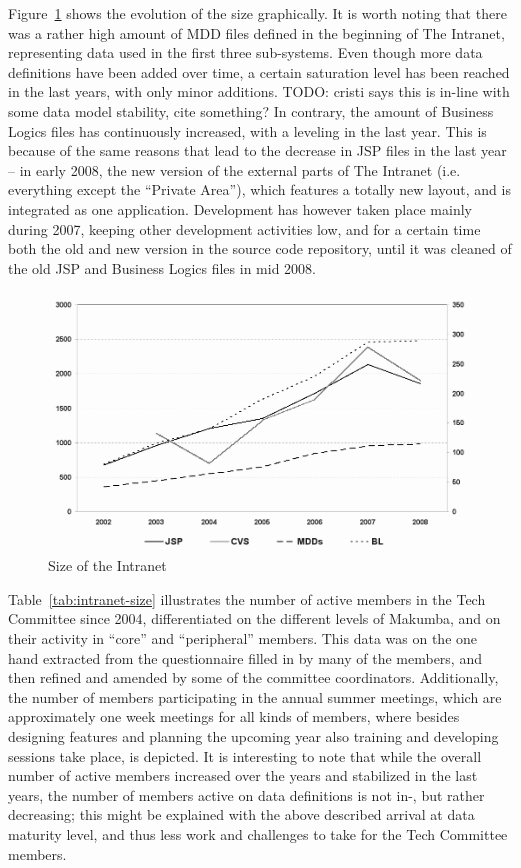 \documentclass{acm_proc_article-sp}
\begin{document}
Figure~\ref{fig:intranet-size} shows the evolution of the size graphically. It is worth noting that there was a rather high amount of MDD files defined in the beginning of The Intranet, representing data used in the first three sub-systems. Even though more data definitions have been added over time, a certain saturation level has been reached in the last years, with only minor additions. TODO: cristi says this is in-line with some data model stability, cite something?
In contrary, the amount of Business Logics files has continuously increased, with a leveling in the last year. This is because of the same reasons that lead to the decrease in JSP files in the last year -- in early 2008, the new version of the external parts of The Intranet (i.e. everything except the ``Private Area''), which features a totally new layout, and is integrated as one application. Development has however taken place mainly during 2007, keeping other development activities low, and for a certain time both the old and new version in the source code repository, until it was cleaned of the old JSP and Business Logics files in mid 2008.

\begin{figure}\label{fig:intranet-size}
  \includegraphics[width=0.98\columnwidth]{figures/SizeChart}
  \caption{Size of the Intranet}
\end{figure} 

Table~\ref{tab:intranet-size} illustrates the number of active members in the Tech Committee since 2004, differentiated on the different levels of Makumba, and on their activity in ``core'' and ``peripheral'' members. This data was on the one hand extracted from the questionnaire filled in by many of the members, and then refined and amended by some of the committee coordinators. Additionally, the number of members participating in the annual summer meetings, which are approximately one week meetings for all kinds of members, where besides designing features and planning the upcoming year also training and developing sessions take place, is depicted. It is interesting to note that while the overall number of active members increased over the years and stabilized in the last years, the number of members active on data definitions is not in-, but rather decreasing; this might be explained with the above described arrival at data maturity level, and thus less work and challenges to take for the Tech Committee members.
\end{document}
